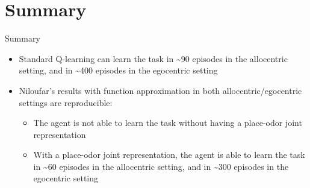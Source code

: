 \documentclass[bigger]{beamer}
\begin{document}
\section{Summary}
\label{sec:orgc75b465}
\begin{frame}[<+->][label={sec:orgbda17e3}]{Summary}
\begin{itemize}
\item Standard Q-learning can learn the task in \textasciitilde{}90 episodes in the \alert{allocentric} setting, and in \textasciitilde{}400 episodes in the \alert{egocentric} setting
\item Niloufar's results with function approximation in both allocentric/egocentric settings are reproducible:
\begin{itemize}
\item The agent is \alert{not able to learn} the task \alert{without} having a place-odor joint representation
\item \alert{With} a place-odor joint representation, the agent is \alert{able to learn the task} in \textasciitilde{}60 episodes in the \alert{allocentric} setting, and in \textasciitilde{}300 episodes in the \alert{egocentric} setting
\end{itemize}
\end{itemize}
\end{frame}
\end{document}
